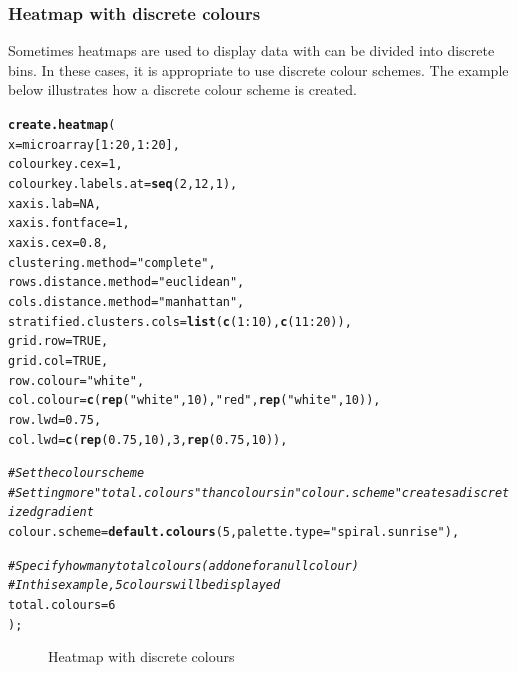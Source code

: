 \documentclass[letterpaper]{article}\usepackage[]{graphicx}\usepackage[]{color}
\makeatletter
\newcommand{\hlnum}[1]{\textcolor[rgb]{0.686,0.059,0.569}{#1}}%
\newcommand{\hlstr}[1]{\textcolor[rgb]{0.192,0.494,0.8}{#1}}%
\newcommand{\hlcom}[1]{\textcolor[rgb]{0.678,0.584,0.686}{\textit{#1}}}%
\newcommand{\hlopt}[1]{\textcolor[rgb]{0,0,0}{#1}}%
\newcommand{\hlstd}[1]{\textcolor[rgb]{0.345,0.345,0.345}{#1}}%
\newcommand{\hlkwc}[1]{\textcolor[rgb]{0.333,0.667,0.333}{#1}}%
\newcommand{\hlkwd}[1]{\textcolor[rgb]{0.737,0.353,0.396}{\textbf{#1}}}%
\newenvironment{kframe}{%
 \def\at@end@of@kframe{}%
 \ifinner\ifhmode%
  \def\at@end@of@kframe{\end{minipage}}%
  \begin{minipage}{\columnwidth}%
 \fi\fi%
 \def\FrameCommand##1{\hskip\@totalleftmargin \hskip-\fboxsep
 \colorbox{shadecolor}{##1}\hskip-\fboxsep
     \hskip-\linewidth \hskip-\@totalleftmargin \hskip\columnwidth}%
 \MakeFramed {\advance\hsize-\width
   \@totalleftmargin\z@ \linewidth\hsize
   \@setminipage}}%
 {\par\unskip\endMakeFramed%
 \at@end@of@kframe}
\newenvironment{knitrout}{}{} %
\makeatother
\begin{document}
\subsubsection{Heatmap with discrete colours}
Sometimes heatmaps are used to display data with can be divided into discrete bins. In these cases, it is appropriate to use discrete colour schemes. The example below illustrates how a discrete colour scheme is created.

\begin{knitrout}
\color{fgcolor}\begin{kframe}
\begin{alltt}
\hlkwd{create.heatmap}\hlstd{(}
    \hlkwc{x} \hlstd{= microarray[}\hlnum{1}\hlopt{:}\hlnum{20}\hlstd{,} \hlnum{1}\hlopt{:}\hlnum{20}\hlstd{],}
    \hlkwc{colourkey.cex} \hlstd{=} \hlnum{1}\hlstd{,}
    \hlkwc{colourkey.labels.at} \hlstd{=} \hlkwd{seq}\hlstd{(}\hlnum{2}\hlstd{,} \hlnum{12}\hlstd{,} \hlnum{1}\hlstd{),}
    \hlkwc{xaxis.lab} \hlstd{=} \hlnum{NA}\hlstd{,}
    \hlkwc{xaxis.fontface} \hlstd{=} \hlnum{1}\hlstd{,}
    \hlkwc{xaxis.cex} \hlstd{=} \hlnum{0.8}\hlstd{,}
    \hlkwc{clustering.method} \hlstd{=} \hlstr{"complete"}\hlstd{,}
    \hlkwc{rows.distance.method} \hlstd{=} \hlstr{"euclidean"}\hlstd{,}
    \hlkwc{cols.distance.method} \hlstd{=} \hlstr{"manhattan"}\hlstd{,}
    \hlkwc{stratified.clusters.cols} \hlstd{=} \hlkwd{list}\hlstd{(}\hlkwd{c}\hlstd{(}\hlnum{1}\hlopt{:}\hlnum{10}\hlstd{),} \hlkwd{c}\hlstd{(}\hlnum{11}\hlopt{:}\hlnum{20}\hlstd{)),}
    \hlkwc{grid.row} \hlstd{=} \hlnum{TRUE}\hlstd{,}
    \hlkwc{grid.col} \hlstd{=} \hlnum{TRUE}\hlstd{,}
    \hlkwc{row.colour} \hlstd{=} \hlstr{"white"}\hlstd{,}
    \hlkwc{col.colour} \hlstd{=} \hlkwd{c}\hlstd{(}\hlkwd{rep}\hlstd{(}\hlstr{"white"}\hlstd{,} \hlnum{10}\hlstd{),} \hlstr{"red"}\hlstd{,} \hlkwd{rep}\hlstd{(}\hlstr{"white"}\hlstd{,}\hlnum{10}\hlstd{)),}
    \hlkwc{row.lwd} \hlstd{=} \hlnum{0.75}\hlstd{,}
    \hlkwc{col.lwd} \hlstd{=} \hlkwd{c}\hlstd{(}\hlkwd{rep}\hlstd{(}\hlnum{0.75}\hlstd{,} \hlnum{10}\hlstd{),} \hlnum{3}\hlstd{,} \hlkwd{rep}\hlstd{(}\hlnum{0.75}\hlstd{,}\hlnum{10}\hlstd{)),}

   \hlcom{# Set the colour scheme}
   \hlcom{# Setting more "total.colours" than colours  in "colour.scheme" creates a discretized gradient}
   \hlkwc{colour.scheme} \hlstd{=} \hlkwd{default.colours}\hlstd{(}\hlnum{5}\hlstd{,} \hlkwc{palette.type} \hlstd{=} \hlstr{"spiral.sunrise"}\hlstd{),}

   \hlcom{# Specify how many total colours (add one for a null colour)}
   \hlcom{# In this example, 5 colours will be displayed}
   \hlkwc{total.colours} \hlstd{=} \hlnum{6}
   \hlstd{);}
\end{alltt}
\end{kframe}\begin{figure}[]


{\centering {} 

}

\caption[Heatmap with discrete colours]{Heatmap with discrete colours\label{fig:heatmap7}}
\end{figure}


\end{knitrout}
\end{document}
